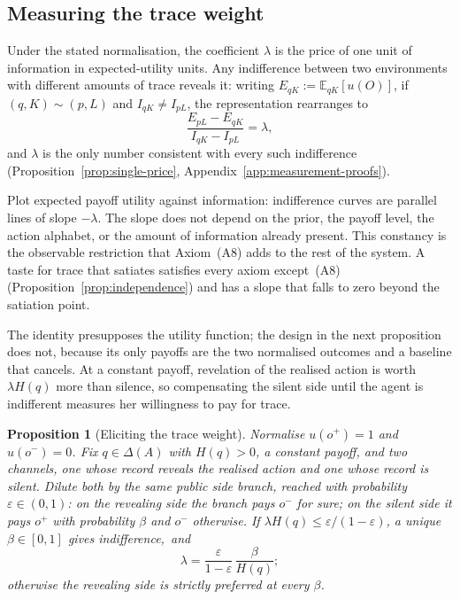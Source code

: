 \documentclass[11pt,a4paper]{article}
\newtheorem{proposition}[theorem]{Proposition}
\theoremstyle{definition}
\newcommand{\D}{\Delta}
\newcommand{\E}{\mathbb E}
\newcommand{\I}{I}
\newcommand{\Sh}{H}
\newcommand{\1}{\mathbf 1}
\begin{document}
\subsection{Measuring the trace weight}\label{sec:measurement}

Under the stated normalisation, the coefficient $\lambda$ is the price of one unit of information in expected-utility units.  Any indifference
between two environments with different amounts of trace reveals it: writing $E_{qK}:=\E_{qK}[u(O)]$, if
$(q,K)\sim(p,L)$ and $\I_{qK}\ne\I_{pL}$, the representation rearranges to
\[
 \frac{E_{pL}-E_{qK}}{\I_{qK}-\I_{pL}}=\lambda,
\]
and $\lambda$ is the only number consistent with every such indifference
(Proposition~\ref{prop:single-price}, Appendix~\ref{app:measurement-proofs}).

Plot expected payoff utility against information: indifference curves are parallel lines of slope $-\lambda$.  The slope does
not depend on the prior, the payoff level, the action alphabet, or the amount of information already present.
This constancy is the observable restriction that Axiom~\textup{(A8)} adds to the rest of the system.  A taste for trace that satiates satisfies every axiom except~\textup{(A8)} (Proposition~\ref{prop:independence}) and has a slope that falls to zero beyond the satiation point.


The identity presupposes the utility function; the design in the next proposition does not, because its only
payoffs are the two normalised outcomes and a baseline that cancels.  At a constant payoff, revelation of the
realised action is worth $\lambda\Sh(q)$ more than silence, so compensating the silent side until the agent is
indifferent measures her willingness to pay for trace.

\begin{proposition}[Eliciting the trace weight]\label{prop:elicit}
Normalise $u(o^+)=1$ and $u(o^-)=0$.  Fix $q\in\D(A)$ with $\Sh(q)>0$, a constant payoff, and two channels, one
whose record reveals the realised action and one whose record is silent.  Dilute both by the same public side
branch, reached with probability $\varepsilon\in(0,1)$: on the revealing side the branch pays $o^-$ for sure; on
the silent side it pays $o^+$ with probability $\beta$ and $o^-$ otherwise.  If
$\lambda\Sh(q)\le\varepsilon/(1-\varepsilon)$, a unique $\beta\in[0,1]$ gives indifference,~and
\[
 \lambda=\frac{\varepsilon}{1-\varepsilon}\,\frac{\beta}{\Sh(q)};
\]
otherwise the revealing side is strictly preferred at every $\beta$.
\end{proposition}
\end{document}
